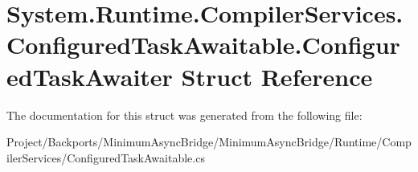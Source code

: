 \hypertarget{struct_system_1_1_runtime_1_1_compiler_services_1_1_configured_task_awaitable_1_1_configured_task_awaiter}{}\section{System.\+Runtime.\+Compiler\+Services.\+Configured\+Task\+Awaitable.\+Configured\+Task\+Awaiter Struct Reference}
\label{struct_system_1_1_runtime_1_1_compiler_services_1_1_configured_task_awaitable_1_1_configured_task_awaiter}


The documentation for this struct was generated from the following file\+:\begin{DoxyCompactItemize}
\item 
Project/\+Backports/\+Minimum\+Async\+Bridge/\+Minimum\+Async\+Bridge/\+Runtime/\+Compiler\+Services/Configured\+Task\+Awaitable.\+cs\end{DoxyCompactItemize}
